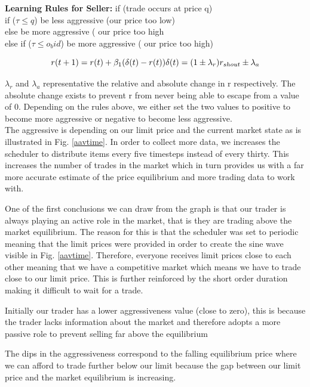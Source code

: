 \documentclass{acm_proc_article-sp}
\begin{document}
\textbf{Learning Rules for Seller:}
if (trade occurs at price q)\\
    \indent if ($\tau \leq q$) be less aggressive (our price too low)\\
    \indent else be more aggressive ( our price too high\\
else if ($\tau \leq o_bid$) be more aggressive ( our price too high)

\begin{equation}
r(t+1) = r(t) + \beta_1(\delta(t) - r(t))\\\delta(t) = (1 \pm
\lambda_r)r_{shout} \pm \lambda_a
\label{updateaggressive}
\end{equation}

$\lambda_r$ and $\lambda_a$ representative the relative and absolute change in
r respectively. The absolute change exists to prevent r from never being able
to escape from a value of 0. Depending on the rules above, we either set the
two values to positive to become more aggressive or negative to become less
aggressive.\\

The aggressive is depending on our limit price and the current market state as
is illustrated in Fig. \ref{aavtime}. In order to collect more data, we
increases the scheduler to distribute items every five timesteps instead of
every thirty. This increases the number of trades in the market which in turn
provides us with a far more accurate estimate of the price equilibrium and more
trading data to work with.

One of the first conclusions we can draw from the graph is that our trader is
always playing an active role in the market, that is they are trading above the
market equilibrium. The reason for this is that the scheduler was set to
periodic meaning that the limit prices were provided in order to create the
sine wave visible in Fig. \ref{aavtime}. Therefore, everyone receives limit
prices close to each other meaning that we have a competitive market which
means we have to trade close to our limit price. This is further reinforced by
the short order duration making it difficult to wait for a trade.

Initially our trader has a lower aggressiveness value (close to zero), this is
because the trader lacks information about the market and therefore adopts a
more passive role to prevent selling far above the equilibrium

The dips in the aggressiveness correspond to the falling equilibrium price
where we can afford to trade further below our limit because the gap between
our limit price and the market equilibrium is increasing.
\end{document}

